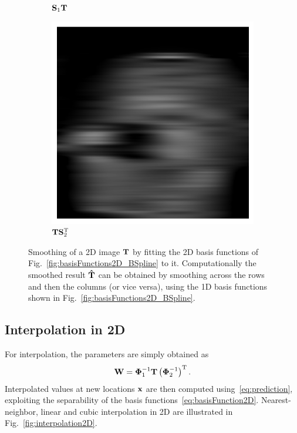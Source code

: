 \documentclass[10pt,twoside]{book}
\begin{document}
\begin{figure}
\begin{subfigure}{0.45\textwidth}
     \caption{$\mathbf{S}_1 \mathbf{T}$}
  \end{subfigure}
  \hfill
  \begin{subfigure}{0.45\textwidth}
     \includegraphics[width=\textwidth]{smoothing2D_decimationFactor51_smoothingColumnWise}
     \caption{$\mathbf{T} \mathbf{S}_2^\mathrm{T}$}
  \end{subfigure}
  \caption{%
  Smoothing of a 2D image $\mathbf{T}$ by fitting the 2D basis functions of Fig.~\ref{fig:basisFunctions2D_BSpline} to it. Computationally the smoothed result $\mathbf{\hat{T}}$ can be obtained by smoothing across the rows and then the columns (or vice versa), using the 1D basis functions shown in Fig.~\ref{fig:basisFunctions2D_BSpline}.
  }
  \label{fig:smoothing2D}
\end{figure}



\subsection{Interpolation in 2D}
\label{sec:interpolationIn2D}

For interpolation, the parameters are simply obtained as 
$$
\mathbf{W} = {\mbox{\boldmath {${\Phi}$}}}_1^{-1} \mathbf{T} \left({\mbox{\boldmath {${\Phi}$}}}_2^{-1}\right)^\mathrm{T} 
.
$$
Interpolated values at new locations $\mathbf{x}$ are then computed using~\eqref{eq:prediction}, exploiting the separability of the basis functions~\eqref{eq:basisFunction2D}. 
Nearest-neighbor, linear and cubic interpolation in 2D are illustrated in Fig.~\ref{fig:interpolation2D}.
\end{document}

